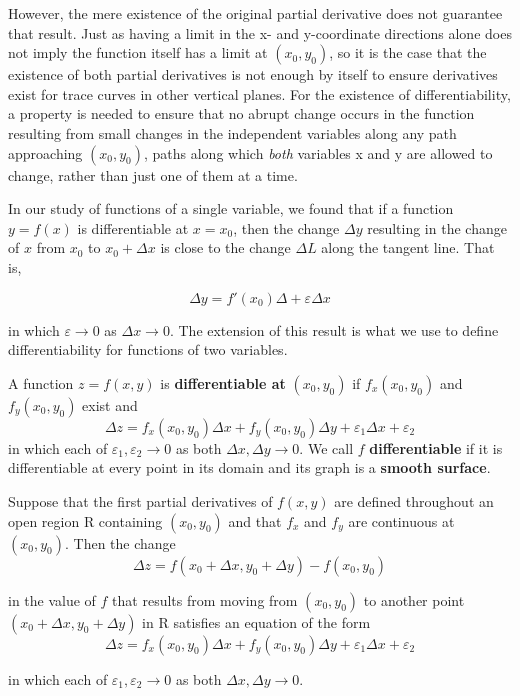 \documentclass[12pt,a4paper,draft]{article}
\newenvironment{definition}{\begin{definitionbox}}{\end{definitionbox}\vspace{1\baselineskip}}
\newenvironment{theorem}{\begin{theorembox}}{\end{theorembox}\vspace{1\baselineskip}}
\begin{document}
However, the mere existence of the original partial derivative does not guarantee that result. Just as having a limit in the x- and y-coordinate directions alone does not imply the function itself has a limit at \((x_0,y_0)\), so it is the case that the existence of both partial derivatives is not enough by itself to ensure derivatives exist for trace curves in other vertical planes. 
For the existence of differentiability, a property is needed to ensure that no abrupt change occurs in the function resulting from small changes in the independent variables along any path approaching \((x_0,y_0)\), paths along which \textit{both} variables x and y are allowed to change, rather than just one of them at a time.


In our study of functions of a single variable, we found that if a function \(y= f(x)\) is differentiable at \(x=x_0\), then the change \(\Delta y\) resulting in the change of \(x\) from \(x_0\) to \(x_0 + \Delta x\) is close to the change \(\Delta L\) along the tangent line. That is,

\[\Delta y= f'(x_0)\Delta + \varepsilon \Delta x\]

in which \(\varepsilon \to 0\) as \(\Delta x \to 0\). The extension of this result is what we use to define differentiability for functions of two variables.

\begin{definition}
    A function \(z = f(x,y)\) is \textbf{differentiable at} \((x_0,y_0)\) if \(f_x(x_0,y_0)\) and \(f_y(x_0,y_0)\) exist and 
    \[\Delta z = f_x(x_0,y_0) \Delta x + f_y(x_0,y_0) \Delta y + \varepsilon_1\Delta x + \varepsilon_2\]
    in which each of \(\varepsilon_1, \varepsilon_2 \to 0\) as both \(\Delta x, \Delta y \to 0\). We call \(f\) \textbf{differentiable} if it is differentiable at every point in its domain and its graph is a \textbf{smooth surface}.

\end{definition}


\begin{theorem}
    Suppose that the first partial derivatives of \(f(x,y)\) are defined throughout an open region R containing \((x_0,y_0)\) and that \(f_x\) and \(f_y\) are continuous at \((x_0,y_0)\). Then the change
    \[\Delta z = f(x_0 + \Delta x, y_0 + \Delta y) - f(x_0,y_0)\]
    
    in the value of \(f\) that results from moving from \((x_0,y_0)\) to another point \((x_0 +\Delta x,y_0+ \Delta y)\) in R satisfies an equation of the form
    \[\Delta z = f_x(x_0,y_0) \Delta x + f_y(x_0,y_0) \Delta y + \varepsilon_1\Delta x + \varepsilon_2\]

    in which each of \(\varepsilon_1, \varepsilon_2 \to 0\) as both \(\Delta x, \Delta y \to 0\).
\end{theorem}
\end{document}
